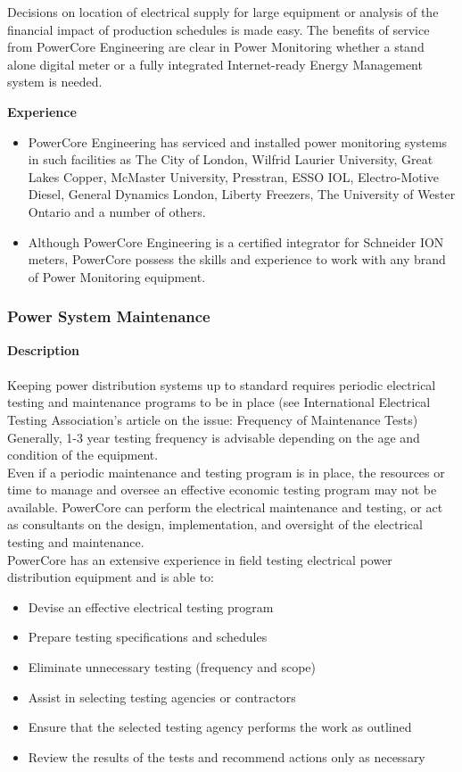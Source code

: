Decisions on location of electrical supply for large equipment or analysis of the financial impact of production schedules is made easy. The benefits of service from PowerCore Engineering are clear in Power Monitoring whether a stand alone digital meter or a fully integrated Internet-ready Energy Management system is needed. 

\textbf{Experience}\\
\begin{itemize}
	\item PowerCore Engineering has serviced and installed power monitoring systems in such facilities as The City of London, Wilfrid Laurier University, Great Lakes Copper, McMaster University, Presstran, ESSO IOL, Electro-Motive Diesel, General Dynamics London, Liberty Freezers, The University of Wester Ontario and a number of others.
	\item Although PowerCore Engineering is a certified integrator for Schneider ION meters, PowerCore possess the skills and experience to work with any brand of Power Monitoring equipment.
\end{itemize}


\subsubsection{Power System Maintenance}
\label{Sub:Exp:PSM}

\textbf{Description}\\
\\	 
Keeping power distribution systems up to standard requires periodic electrical testing and maintenance programs to be in place (see International Electrical Testing Association's article on the issue: Frequency of Maintenance Tests) Generally, 1-3 year testing frequency is advisable depending on the age and condition of the equipment. \\

Even if a periodic maintenance and testing program is in place, the resources or time to manage and oversee an effective economic testing program may not be available. PowerCore can perform the electrical maintenance and testing, or act as consultants on the design, implementation, and oversight of the electrical testing and maintenance. \\

PowerCore has an extensive experience in field testing electrical power distribution equipment and is able to: 
\begin{itemize}
	\item Devise an effective electrical testing program
	\item Prepare testing specifications and schedules
	\item Eliminate unnecessary testing (frequency and scope)
	\item Assist in selecting testing agencies or contractors
	\item Ensure that the selected testing agency performs the work as outlined
	\item Review the results of the tests and recommend actions only as necessary
\end{itemize}

